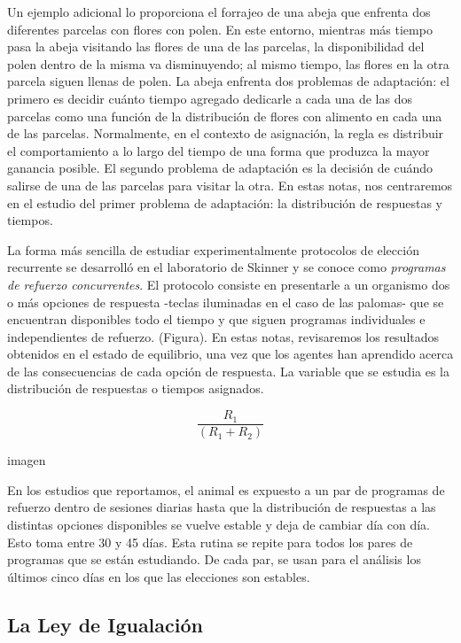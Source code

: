 \documentclass[
  a4paper,
  DIV=11,
  numbers=noendperiod]{scrreprt}
\begin{document}
Un ejemplo adicional lo proporciona el forrajeo de una abeja que
enfrenta dos diferentes parcelas con flores con polen. En este entorno,
mientras más tiempo pasa la abeja visitando las flores de una de las
parcelas, la disponibilidad del polen dentro de la misma va
disminuyendo; al mismo tiempo, las flores en la otra parcela siguen
llenas de polen. La abeja enfrenta dos problemas de adaptación: el
primero es decidir cuánto tiempo agregado dedicarle a cada una de las
dos parcelas como una función de la distribución de flores con alimento
en cada una de las parcelas. Normalmente, en el contexto de asignación,
la regla es distribuir el comportamiento a lo largo del tiempo de una
forma que produzca la mayor ganancia posible. El segundo problema de
adaptación es la decisión de cuándo salirse de una de las parcelas para
visitar la otra. En estas notas, nos centraremos en el estudio del
primer problema de adaptación: la distribución de respuestas y tiempos.

La forma más sencilla de estudiar experimentalmente protocolos de
elección recurrente se desarrolló en el laboratorio de Skinner y se
conoce como \emph{programas de refuerzo concurrentes}. El protocolo
consiste en presentarle a un organismo dos o más opciones de respuesta
-teclas iluminadas en el caso de las palomas- que se encuentran
disponibles todo el tiempo y que siguen programas individuales e
independientes de refuerzo. (Figura). En estas notas, revisaremos los
resultados obtenidos en el estado de equilibrio, una vez que los agentes
han aprendido acerca de las consecuencias de cada opción de respuesta.
La variable que se estudia es la distribución de respuestas o tiempos
asignados.

\[\frac{R_1} {(R_1 +R_2)}\]

imagen

En los estudios que reportamos, el animal es expuesto a un par de
programas de refuerzo dentro de sesiones diarias hasta que la
distribución de respuestas a las distintas opciones disponibles se
vuelve estable y deja de cambiar día con día. Esto toma entre 30 y 45
días. Esta rutina se repite para todos los pares de programas que se
están estudiando. De cada par, se usan para el análisis los últimos
cinco días en los que las elecciones son estables.

\subsection{La Ley de Igualación}\label{la-ley-de-igualaciuxf3n}
\end{document}
